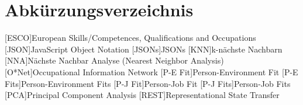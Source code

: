 \renewcommand{\chaptermark}[1]{\markboth{\spacedlowsmallcaps{#1}}{\spacedlowsmallcaps{#1}}}
\renewcommand{\sectionmark}[1]{\markright{\thesection\enspace\spacedlowsmallcaps{#1}}}
\chapter*{Abk\"{u}rzungsverzeichnis}

\begin{acronym}[AWGN]%
  [ESCO]{European Skills/Competences, Qualifications and Occupations}
  [JSON]{JavaScript Object Notation}
  [JSONs]{JSONs}
  [KNN]{k-nächste Nachbarn}
  [NNA]{Nächste Nachbar Analyse (Nearest Neighbor Analysis)}
  [O*Net]{Occupational Information Network}
  [P-E Fit]{Person-Environment Fit}
  [P-E Fits]{Person-Environment Fits}
  [P-J Fit]{Person-Job Fit}
  [P-J Fits]{Person-Job Fits}
  [PCA]{Principal Component Analysis}
  [REST]{Representational State Transfer}
\end{acronym}

\cleardoublepage
